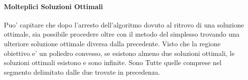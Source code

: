 \paragraph{Molteplici Soluzioni Ottimali}

Puo' capitare che dopo l'arresto dell'algoritmo dovuto al ritrovo di una soluzione ottimale, sia possibile procedere oltre con il metodo del simplesso trovando una ulteriore soluzione ottimale diversa dalla precedente.
Visto che la regione obiettivo e' un poliedro convesso, se esistono almeno due soluzioni ottimali, le soluzioni ottimali esistono e sono infinite. Sono Tutte quelle comprese nel segmento delimitato dalle due trovate in precedenza.
